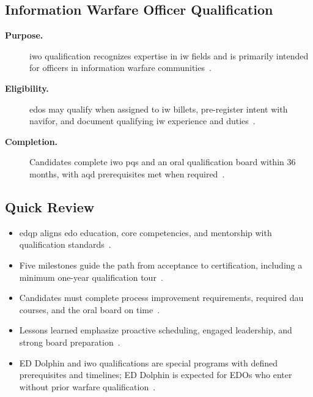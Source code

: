 \documentclass[../main.tex]{subfiles}
\begin{document}
\subsection{Information Warfare Officer Qualification}
\begin{description}
  \item[\textbf{Purpose.}] \ac{iwo} qualification recognizes expertise in \ac{iw} fields and is primarily
  intended for officers in information warfare communities~\autocite{edo-5-2-2-edqp-2025}.
  \item[\textbf{Eligibility.}] \ac{edo}s may qualify when assigned to \ac{iw} billets, pre-register intent with
  \ac{navifor}, and document qualifying \ac{iw} experience and duties~\autocite{edo-5-2-2-edqp-2025}.
  \item[\textbf{Completion.}] Candidates complete \ac{iwo} \ac{pqs} and an oral qualification board within
  36 months, with \ac{aqd} prerequisites met when required~\autocite{edo-5-2-2-edqp-2025}.
\end{description}

\subsection{Quick Review}
\begin{itemize}
  \item \ac{edqp} aligns \ac{edo} education, core competencies, and mentorship with qualification standards~\autocite{edo-5-2-2-edqp-2025}.
  \item Five milestones guide the path from acceptance to certification, including a minimum one-year qualification tour~\autocite{edo-5-2-2-edqp-2025}.
  \item Candidates must complete process improvement requirements, required \ac{dau} courses, and the oral board on time~\autocite{edo-5-2-2-edqp-2025}.
  \item Lessons learned emphasize proactive scheduling, engaged leadership, and strong board preparation~\autocite{edo-5-2-2-edqp-2025}.
  \item ED Dolphin and \ac{iwo} qualifications are special programs with defined prerequisites and timelines; ED Dolphin is expected for EDOs who enter without prior warfare qualification~\autocite{edo-5-2-2-edqp-2025,MILPERSMAN-1301-220-EDO-Assignment}.
\end{itemize}

\end{document}
